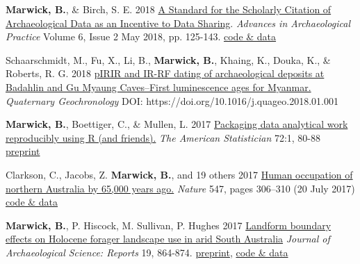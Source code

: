 \documentclass[11pt,article,oneside]{memoir}
\begin{document}
\ind \textbf{Marwick, B.}, \& Birch, S. E. 2018 \href{https://doi.org/10.1017/aap.2018.3}{A Standard for the Scholarly Citation of Archaeological Data as an Incentive to Data Sharing}.  \textit{Advances in Archaeological Practice} Volume 6, Issue 2 May 2018, pp. 125-143. \href{https://doi.org/10.17605/OSF.IO/KSRUZ}{code \& data}

\ind Schaarschmidt, M., Fu, X., Li, B., \textbf{Marwick, B.}, Khaing, K., Douka, K., \& Roberts, R. G. 2018 \href{https://doi.org/10.1016/j.quageo.2018.01.001}{pIRIR and IR-RF dating of archaeological deposits at Badahlin and Gu Myaung Caves–First luminescence ages for Myanmar.} \textit{Quaternary Geochronology} DOI: https://doi.org/10.1016/j.quageo.2018.01.001

\ind \textbf{Marwick, B.}, Boettiger, C., \& Mullen, L. 2017 \href{https://doi.org/10.1080/00031305.2017.1375986}{Packaging data analytical work reproducibly using R (and friends).} \textit{The American Statistician} 72:1, 80-88 \href{https://doi.org/10.7287/peerj.preprints.3192v1}{preprint}

\ind  Clarkson, C., Jacobs, Z. \textbf{Marwick, B.}, and 19 others 2017 \href{http://dx.doi.org/10.1038/nature22968}{Human occupation of northern Australia by 65,000 years ago.} \textit{Nature} 547, pages 306–310 (20 July 2017) \href{https://doi.org/10.17605/OSF.IO/QWFCZ}{code \& data}

\ind  \textbf{Marwick, B.}, P. Hiscock, M. Sullivan, P. Hughes 2017 \href{http://doi.org/10.1016/j.jasrep.2017.07.004}{Landform boundary effects on Holocene forager landscape use in arid South Australia} \textit{Journal of Archaeological Science: Reports} 19, 864-874. \href{https://doi.org/10.17605/OSF.IO/V2MS9}{preprint}, \href{https://doi.org/10.17605/OSF.IO/EDZXS}{code \& data}
\end{document}
